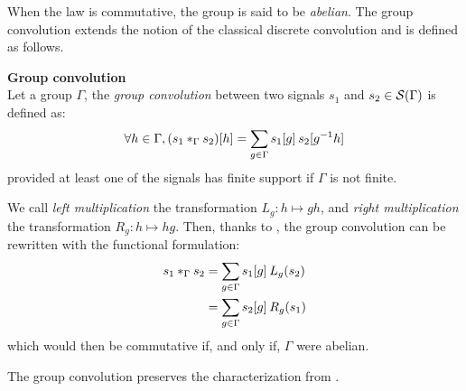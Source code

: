 When the law is commutative, the group is said to be \emph{abelian}.
The group convolution extends the notion of the classical discrete convolution and is defined as follows.

\begin{definition}\textbf{Group convolution}\\
Let a group $\Gamma$, the \emph{group convolution} between two signals $s_1$ and $s_2 \in \cs(\Gamma)$ is defined as:
\begin{align*}
\forall h \in \Gamma, (s_1 \ast_{\Gamma} s_2) [h] = \displaystyle \sum_{g \in \Gamma} s_1[g] \h{2} s_2[g^{-1}h]
\end{align*}
provided at least one of the signals has finite support if $\Gamma$ is not finite.
\label{def:conv1}
\end{definition}

We call \emph{left multiplication} the transformation $L_g: h \mapsto gh$, and \emph{right multiplication} the transformation $R_g: h \mapsto hg$. Then, thanks to , the group convolution can be rewritten with the functional formulation:
\begin{align}
s_1 \ast_{\Gamma} s_2 & = \displaystyle \sum_{g \in \Gamma} s_1[g] \h{2} L_g(s_2) \label{eq:lm}\\
                      &  = \displaystyle \sum_{g \in \Gamma} s_2[g] \h{2} R_g(s_1) \label{eq:rm}
\end{align}
which would then be commutative if, and only if, $\Gamma$ were abelian.

The group convolution preserves the characterization from .

